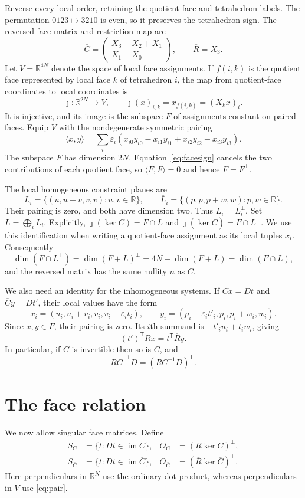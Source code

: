 \documentclass[11pt]{article}
\theoremstyle{definition}\newtheorem{definition}[theorem]{Definition}
\theoremstyle{remark}\newtheorem{remark}[theorem]{Remark}
\DeclareMathOperator{\im}{im}
\newcommand{\R}{\mathbb R}
\newcommand{\Ct}{\overline C}
\newcommand{\Rt}{\overline R}
\newcommand{\eps}{\varepsilon}
\begin{document}
Reverse every local order, retaining the quotient-face and tetrahedron
labels. The permutation $0123\mapsto3210$ is even, so it preserves the
tetrahedron sign. The reversed face matrix and restriction map are
\[
\Ct=\begin{pmatrix}X_3-X_2+X_1\\X_1-X_0\end{pmatrix},
\qquad \Rt=X_3.
\]
Let $V=\R^{4N}$ denote the space of local face assignments. If $f(i,k)$
is the quotient face represented by local face $k$ of tetrahedron $i$,
the map from quotient-face coordinates to local coordinates is
\[
\jmath:\R^{2N}\longrightarrow V,\qquad
\jmath(x)_{i,k}=x_{f(i,k)}=(X_kx)_i.
\]
It is injective, and its image is the subspace $F$ of assignments
constant on paired faces. Equip $V$ with
the nondegenerate symmetric pairing
\begin{equation}
\langle x,y\rangle=
\sum_i\eps_i(x_{i0}y_{i0}-x_{i1}y_{i1}+x_{i2}y_{i2}-x_{i3}y_{i3}).
\label{eq:pair}
\end{equation}
The subspace $F$ has dimension $2N$.
Equation~\eqref{eq:facesign} cancels the two contributions
of each quotient face, so $\langle F,F\rangle=0$ and hence $F=F^\perp$.

The local homogeneous constraint planes are
\[
L_i=\{(u,u+v,v,v):u,v\in\R\},\qquad
\overline L_i=\{(p,p,p+w,w):p,w\in\R\}.
\]
Their pairing is zero, and both have dimension two. Thus
$\overline L_i=L_i^\perp$. Set $L=\bigoplus_iL_i$. Explicitly,
$\jmath(\ker C)=F\cap L$ and
$\jmath(\ker\Ct)=F\cap L^\perp$. We use this identification when
writing a quotient-face assignment as its local tuples $x_i$.
Consequently
\[
\dim(F\cap L^\perp)
=\dim(F+L)^\perp
=4N-\dim(F+L)
=\dim(F\cap L),
\]
and the reversed matrix has the same nullity $n$ as $C$.

We also need an identity for the inhomogeneous systems. If $Cx=Dt$
and $\Ct y=Dt'$, their local values have the form
\[
x_i=(u_i,u_i+v_i,v_i,v_i-\eps_it_i),\qquad
y_i=(p_i-\eps_it'_i,p_i,p_i+w_i,w_i).
\]
Since $x,y\in F$, their pairing is zero. Its $i$th summand is
$-t'_iu_i+t_iw_i$, giving
\begin{equation}
(t')^{\mathsf T}Rx=t^{\mathsf T}\Rt y.
\label{eq:mixed}
\end{equation}
In particular, if $C$ is invertible then so is $\Ct$, and
\begin{equation}
\Rt\Ct^{-1}D=(RC^{-1}D)^{\mathsf T}.
\label{eq:transpose}
\end{equation}

\section{The face relation}\label{sec:face-relation}\label{sec:relation}
We now allow singular face matrices. Define
\begin{align*}
S_C&=\{t:Dt\in\im C\},& O_C&=(R\ker C)^\perp,\\
S_{\Ct}&=\{t:Dt\in\im\Ct\},& O_{\Ct}&=(\Rt\ker\Ct)^\perp.
\end{align*}
Here perpendiculars in $\R^N$ use the ordinary dot product, whereas
perpendiculars in $V$ use \eqref{eq:pair}.
\end{document}

